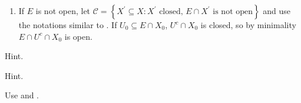 \begin{exercise}\label{ex7.22}
	\begin{enumerate}
	\item[$\Leftarrow$:] If $E$ is not open, let $\mathcal{C}=\left\{X^\prime\subseteq X:X^\prime\text{ closed, }E\cap X^\prime\text{ is not open}\right\}$ and use the notations similar to . If $U_0\subseteq E\cap X_0$, $U^c\cap X_0$ is closed, so by minimality $E\cap U^c\cap X_0$ is open.
	\end{enumerate}
\end{exercise}

\begin{exercise}\label{ex7.23}
	Hint.
\end{exercise}

\begin{exercise}\label{ex7.24}
	Hint.
\end{exercise}

\begin{exercise}\label{ex7.25}
	Use  and .
\end{exercise}

\begin{exercise}\label{ex7.26}
	
\end{exercise}

\begin{exercise}\label{ex7.27}
	
\end{exercise}